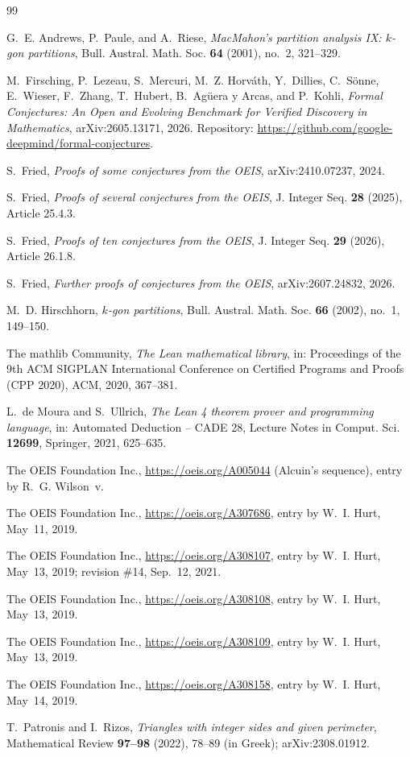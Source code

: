 \documentclass[11pt]{amsart}
\theoremstyle{plain}
\theoremstyle{definition}
\begin{document}
{\small
\begin{thebibliography}{99}

G.~E. Andrews, P.~Paule, and A.~Riese, \emph{MacMahon's partition analysis IX: $k$-gon partitions}, Bull. Austral. Math. Soc. \textbf{64} (2001), no.~2, 321--329.

M.~Firsching, P.~Lezeau, S.~Mercuri, M.~Z. Horv\'ath, Y.~Dillies, C.~S\"onne, E.~Wieser, F.~Zhang, T.~Hubert, B.~Ag\"uera y Arcas, and P.~Kohli, \emph{Formal Conjectures: An Open and Evolving Benchmark for Verified Discovery in Mathematics}, arXiv:2605.13171, 2026. Repository: \url{https://github.com/google-deepmind/formal-conjectures}.

S.~Fried, \emph{Proofs of some conjectures from the OEIS}, arXiv:2410.07237, 2024.

S.~Fried, \emph{Proofs of several conjectures from the OEIS}, J. Integer Seq. \textbf{28} (2025), Article 25.4.3.

S.~Fried, \emph{Proofs of ten conjectures from the OEIS}, J. Integer Seq. \textbf{29} (2026), Article 26.1.8.

S.~Fried, \emph{Further proofs of conjectures from the OEIS}, arXiv:2607.24832, 2026.

M.~D. Hirschhorn, \emph{$k$-gon partitions}, Bull. Austral. Math. Soc. \textbf{66} (2002), no.~1, 149--150.

The mathlib Community, \emph{The Lean mathematical library}, in: Proceedings of the 9th ACM SIGPLAN International Conference on Certified Programs and Proofs (CPP 2020), ACM, 2020, 367--381.

L.~de Moura and S.~Ullrich, \emph{The Lean 4 theorem prover and programming language}, in: Automated Deduction -- CADE 28, Lecture Notes in Comput. Sci. \textbf{12699}, Springer, 2021, 625--635.

The OEIS Foundation Inc., \url{https://oeis.org/A005044} (Alcuin's sequence), entry by R.~G. Wilson~v.

The OEIS Foundation Inc., \url{https://oeis.org/A307686}, entry by W.~I. Hurt, May~11, 2019.

The OEIS Foundation Inc., \url{https://oeis.org/A308107}, entry by W.~I. Hurt, May~13, 2019; revision \#14, Sep.~12, 2021.

The OEIS Foundation Inc., \url{https://oeis.org/A308108}, entry by W.~I. Hurt, May~13, 2019.

The OEIS Foundation Inc., \url{https://oeis.org/A308109}, entry by W.~I. Hurt, May~13, 2019.

The OEIS Foundation Inc., \url{https://oeis.org/A308158}, entry by W.~I. Hurt, May~14, 2019.

T.~Patronis and I.~Rizos, \emph{Triangles with integer sides and given perimeter}, Mathematical Review \textbf{97--98} (2022), 78--89 (in Greek); arXiv:2308.01912.

\end{thebibliography}
}
\end{document}
